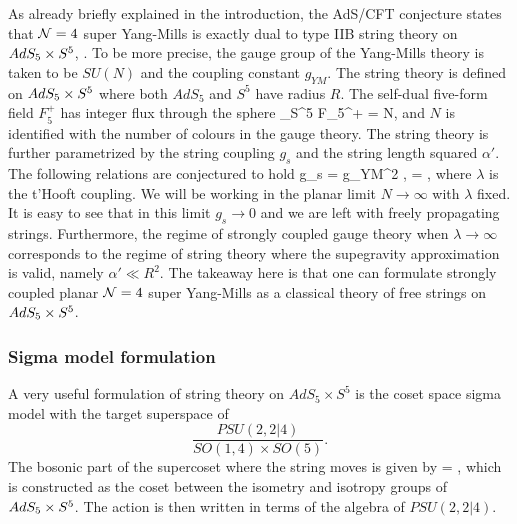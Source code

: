 As already briefly explained in the introduction, the AdS/CFT conjecture states that $\mathcal{N}=4$ super Yang-Mills is exactly dual to type IIB string theory on $AdS_5 \times S^5$, \cite{Maldacena:1997re,Gubser:1998bc,Witten:1998qj}. 
To be more precise, the gauge group of the Yang-Mills theory is taken to be $SU(N)$ and the coupling constant $g_{YM}$. 
The string theory is defined on $AdS_5 \times S^5$ where both $AdS_5$ and $S^5$ have radius $R$. 
The self-dual five-form field $F_5^+$ has integer flux through the sphere
\beq
	\int_{S^5} F_5^+ = N,
\eeq
and $N$ is identified with the number of colours in the gauge theory. 
The string theory is further parametrized by the string coupling $g_s$ and the string length squared $\alpha'$. The following relations are conjectured to hold
\pi g_s = g_{YM}^2 \equiv {}, \;\;\;\;\;\;\;  = \lambda,
\eeq
where $\lambda$ is the t'Hooft coupling. We will be working in the planar limit $N \rightarrow \infty$ with $\lambda$ fixed. 
It is easy to see that in this limit $g_s \rightarrow 0$ and we are left with freely propagating strings.
Furthermore, the regime of strongly coupled gauge theory when $\lambda \rightarrow \infty$ corresponds to the regime of string theory where the supegravity approximation is valid, namely $\alpha' \ll R^2$.
The takeaway here is that one can formulate strongly coupled planar $\mathcal{N}=4$ super Yang-Mills as a classical theory of free strings on $AdS_5 \times S^5$.


\subsubsection{Sigma model formulation}

A very useful formulation of string theory on $AdS_5 \times S^5$ is the coset space sigma model \cite{Metsaev:1998it} with the target superspace of
\begin{equation}
	\frac{PSU(2,2|4)}{SO(1,4) \times SO(5)}.
\end{equation}
\vspace{2pt}
The bosonic part of the supercoset where the string moves is given by
\beq
	 = \adsfive,
\eeq
which is constructed as the coset between the isometry and isotropy groups of $AdS_5 \times S^5$. 
The action is then written in terms of the algebra of $PSU(2,2|4)$.

